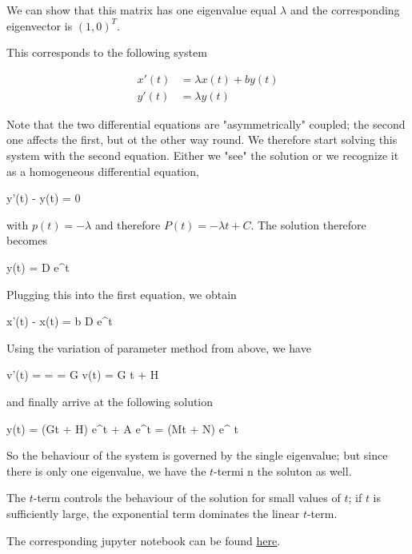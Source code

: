 We can show that this matrix has one eigenvalue equal $\lambda$ and the corresponding eigenvector is $(1,0)^T$.

This corresponds to the following system

\begin{align*}
x'(t) &= \lambda x(t) + b y(t) \\
y'(t) &= \lambda y(t)
\end{align*}

Note that the two differential equations are "asymmetrically" coupled; the second one affects the first, but ot the other way round. We therefore start solving this system with the second equation. Either we "see" the solution or we recognize it as a homogeneous differential equation,

\bee
y'(t) - \lambda y(t) = 0
\eee

with $p(t) = - \lambda$ and therefore $P(t) = -\lambda t + C$. The solution therefore becomes

\bee
y(t) = D e^{\lambda t}
\eee

Plugging this into the first equation, we obtain

\bee
x'(t) - \lambda x(t) = b D e^{\lambda t}
\eee

Using the variation of parameter method from above, we have

\bee
v'(t) =  =  = G \rightarrow v(t) = G t + H
\eee

and finally arrive at the following solution

\bee
y(t) = (Gt + H) e^{\lambda t} + A e^{\lambda t} = (Mt + N) e^{ \lambda t}
\eee

So the behaviour of the system is governed by the single eigenvalue; but since there is only one eigenvalue, we have the $t$-termi n the soluton as well.

The $t$-term controls the behaviour of the solution for small values of $t$; if $t$ is sufficiently large, the exponential term dominates the linear $t$-term.

The corresponding jupyter notebook can be found \href{https://github.com/ClemensFMN/Notebooks/blob/main/ODE/Ex_5.2.11.ipynb}{here}.


